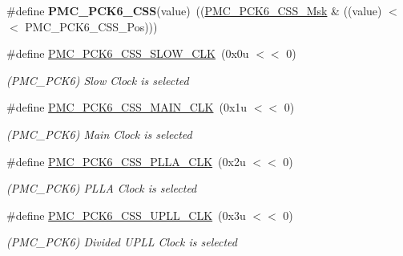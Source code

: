 \begin{DoxyCompactItemize}
\mbox{\label{group__SAMS70__PMC_gab5bb48f4fcc4f94bf5211951db8534f3}} 
\#define {\bfseries P\+M\+C\+\_\+\+P\+C\+K6\+\_\+\+C\+SS}(value)~((\mbox{\hyperlink{group__SAMS70__PMC_ga73701c54834b3fedebedda192dcf0a4a}{P\+M\+C\+\_\+\+P\+C\+K6\+\_\+\+C\+S\+S\+\_\+\+Msk}} \& ((value) $<$$<$ P\+M\+C\+\_\+\+P\+C\+K6\+\_\+\+C\+S\+S\+\_\+\+Pos)))
\item 
\mbox{\label{group__SAMS70__PMC_ga411da468ad2302f0d32406dd76bc67ce}} 
\#define \mbox{\hyperlink{group__SAMS70__PMC_ga411da468ad2302f0d32406dd76bc67ce}{P\+M\+C\+\_\+\+P\+C\+K6\+\_\+\+C\+S\+S\+\_\+\+S\+L\+O\+W\+\_\+\+C\+LK}}~(0x0u $<$$<$ 0)
\begin{DoxyCompactList}\small\item\em (P\+M\+C\+\_\+\+P\+C\+K6) Slow Clock is selected \end{DoxyCompactList}\item 
\mbox{\label{group__SAMS70__PMC_gaa49b4edc0ff550f5d0ab2b25d354ec24}} 
\#define \mbox{\hyperlink{group__SAMS70__PMC_gaa49b4edc0ff550f5d0ab2b25d354ec24}{P\+M\+C\+\_\+\+P\+C\+K6\+\_\+\+C\+S\+S\+\_\+\+M\+A\+I\+N\+\_\+\+C\+LK}}~(0x1u $<$$<$ 0)
\begin{DoxyCompactList}\small\item\em (P\+M\+C\+\_\+\+P\+C\+K6) Main Clock is selected \end{DoxyCompactList}\item 
\mbox{\label{group__SAMS70__PMC_ga8acb50e9f6157b97f86bcbc36f80ac00}} 
\#define \mbox{\hyperlink{group__SAMS70__PMC_ga8acb50e9f6157b97f86bcbc36f80ac00}{P\+M\+C\+\_\+\+P\+C\+K6\+\_\+\+C\+S\+S\+\_\+\+P\+L\+L\+A\+\_\+\+C\+LK}}~(0x2u $<$$<$ 0)
\begin{DoxyCompactList}\small\item\em (P\+M\+C\+\_\+\+P\+C\+K6) P\+L\+LA Clock is selected \end{DoxyCompactList}\item 
\mbox{\label{group__SAMS70__PMC_ga4e74a4fdc8c40a6e70e3ef134a33af59}} 
\#define \mbox{\hyperlink{group__SAMS70__PMC_ga4e74a4fdc8c40a6e70e3ef134a33af59}{P\+M\+C\+\_\+\+P\+C\+K6\+\_\+\+C\+S\+S\+\_\+\+U\+P\+L\+L\+\_\+\+C\+LK}}~(0x3u $<$$<$ 0)
\begin{DoxyCompactList}\small\item\em (P\+M\+C\+\_\+\+P\+C\+K6) Divided U\+P\+LL Clock is selected \end{DoxyCompactList}\item 
$$
\end{DoxyCompactItemize}
